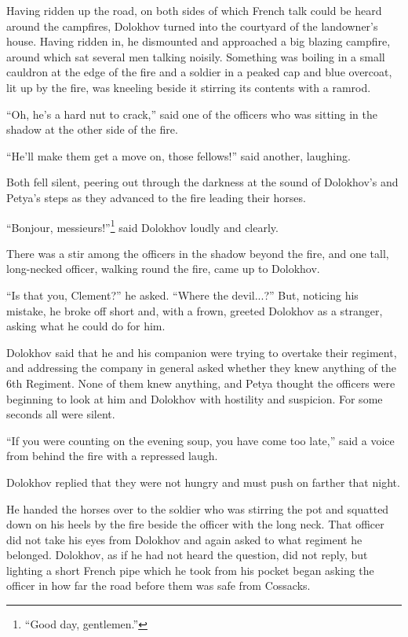 Having ridden up the road, on both sides of which French talk
could be heard around the campfires, Dolokhov turned into the
courtyard of the landowner's house. Having ridden in, he
dismounted and approached a big blazing campfire, around which
sat several men talking noisily.  Something was boiling in a
small cauldron at the edge of the fire and a soldier in a peaked
cap and blue overcoat, lit up by the fire, was kneeling beside it
stirring its contents with a ramrod.

``Oh, he's a hard nut to crack,'' said one of the officers who
was sitting in the shadow at the other side of the fire.

``He'll make them get a move on, those fellows!'' said another,
laughing.

Both fell silent, peering out through the darkness at the sound
of Dolokhov's and Petya's steps as they advanced to the fire
leading their horses.

``Bonjour, messieurs!''\footnote{``Good day, gentlemen.''} said
Dolokhov loudly and clearly.

There was a stir among the officers in the shadow beyond the
fire, and one tall, long-necked officer, walking round the fire,
came up to Dolokhov.

``Is that you, Clement?'' he asked. ``Where the devil...?'' But,
noticing his mistake, he broke off short and, with a frown,
greeted Dolokhov as a stranger, asking what he could do for him.

Dolokhov said that he and his companion were trying to overtake
their regiment, and addressing the company in general asked
whether they knew anything of the 6th Regiment. None of them knew
anything, and Petya thought the officers were beginning to look
at him and Dolokhov with hostility and suspicion. For some
seconds all were silent.

``If you were counting on the evening soup, you have come too
late,'' said a voice from behind the fire with a repressed laugh.

Dolokhov replied that they were not hungry and must push on
farther that night.

He handed the horses over to the soldier who was stirring the pot
and squatted down on his heels by the fire beside the officer
with the long neck. That officer did not take his eyes from
Dolokhov and again asked to what regiment he belonged. Dolokhov,
as if he had not heard the question, did not reply, but lighting
a short French pipe which he took from his pocket began asking
the officer in how far the road before them was safe from
Cossacks.


